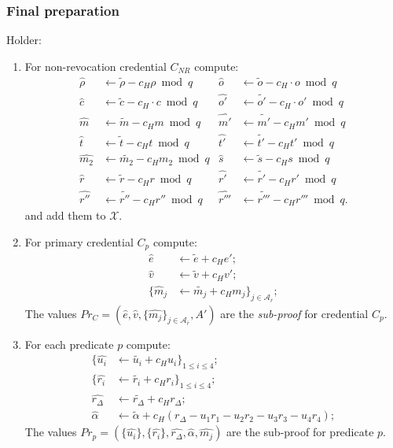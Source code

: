 \documentclass[a4paper]{article}
\begin{document}
\subsubsection{Final preparation}\label{sec:final}
Holder:
\begin{enumerate}
\item For non-revocation credential $C_{NR}$ compute:
\begin{align*}
\widehat{\rho} &\leftarrow \widetilde{\rho} - c_H\rho\bmod{q} &
\widehat{o} &\leftarrow \widetilde{o} - c_H\cdot o\bmod{q}\\
\widehat{c} &\leftarrow \widetilde{c} - c_H\cdot c\bmod{q} &
\widehat{o'} &\leftarrow \widetilde{o'} - c_H\cdot o'\bmod{q}\\
\widehat{m} &\leftarrow \widetilde{m} - c_H m\bmod{q} &
\widehat{m'} &\leftarrow \widetilde{m'} - c_H m'\bmod{q}\\
\widehat{t} &\leftarrow \widetilde{t} - c_H t\bmod{q} &
\widehat{t'} &\leftarrow \widetilde{t'} - c_H t'\bmod{q}\\
\widehat{m_2} &\leftarrow \widetilde{m_2} - c_H m_2\bmod{q} &
\widehat{s} &\leftarrow \widetilde{s} - c_H s\bmod{q}\\
\widehat{r} &\leftarrow \widetilde{r} - c_H r\bmod{q} &
\widehat{r'} &\leftarrow \widetilde{r'} - c_H r'\bmod{q}\\
\widehat{r''} &\leftarrow \widetilde{r''} - c_H r''\bmod{q} &
\widehat{r'''} &\leftarrow \widetilde{r'''} - c_H r'''\bmod{q}.
\end{align*}
and add them to $\mathcal{X}$.
\item For primary credential $C_p$ compute:
\begin{align}
\widehat{e}& \leftarrow \widetilde{e}+c_H e';\\
\widehat{v}& \leftarrow \widetilde{v}+c_H v';\\
\{\widehat{m}_j& \leftarrow \widetilde{m_j} + c_H m_j\}_{j \in \mathcal{A}_{\overline{r}}};
\end{align}
The values $Pr_C=(\widehat{e},\widehat{v},\{\widehat{m_j}\}_{j \in \mathcal{A}_{\overline{r}}},A')$ are the \emph{sub-proof}
for credential $C_p$.
\item For each predicate $p$ compute:
\begin{align}
\{\widehat{u_i}& \leftarrow \widetilde{u_i}+c_H u_i\}_{1\leq i \leq 4};\\
\{\widehat{r_i}& \leftarrow \widetilde{r_i}+c_H r_i\}_{1\leq i \leq 4};\\
\widehat{r_{\Delta}}& \leftarrow \widetilde{r_{\Delta}}+c_H r_{\Delta};\\
\widehat{\alpha}& \leftarrow \widetilde{\alpha}+c_H (r_{\Delta}- u_1r_1 - u_2r_2 - u_3r_3 - u_4r_4);
\end{align}
The values $Pr_p =( \{\widehat{u_i}\}, \{\widehat{r_i}\},\widehat{r_{\Delta}},\widehat{\alpha},\widehat{m_j})$ are the sub-proof for predicate $p$.
\end{enumerate}
\end{document}
